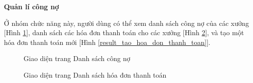 \textbf{Quản lí công nợ}

Ở nhóm chức năng này, người dùng có thể xem danh sách công nợ của các xưởng [Hình \ref{result_danh_sach_cong_no}], danh sách các hóa đơn thanh toán cho các xưởng [Hình \ref{result_danh_sach_hoa_don_thanh_toan}], và tạo một hóa đơn thanh toán mới [Hình \ref{result_tao_hoa_don_thanh_toan}].

\begin{figure}[H]
    \begin{center}
        \caption{Giao diện trang Danh sách công nợ}
        \label{result_danh_sach_cong_no}
    \end{center}
\end{figure}

\begin{figure}[H]
    \begin{center}
        \caption{Giao diện trang Danh sách hóa đơn thanh toán}
        \label{result_danh_sach_hoa_don_thanh_toan}
    \end{center}
\end{figure}

